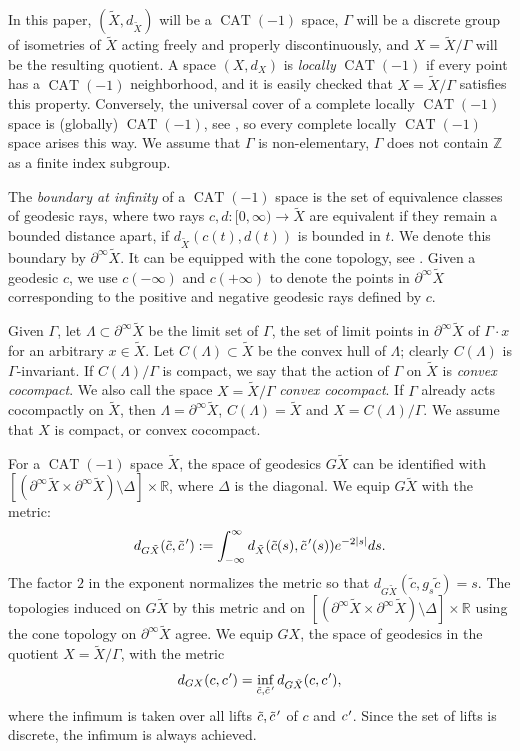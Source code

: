 \documentclass[JEP,XML,SOM,Unicode,NoFloatCountersInSection]{cedram}
\newcommand{\cpr}{c\mkern1mu'}
\newcommand{\tcpr}{\tilde c\mkern2mu'}
\theoremstyle{definition}
\numberwithin{equation}{section}
\DeclareMathOperator{\CAT}{CAT}
\begin{document}
In this paper, $(\tilde X, d_{\tilde X})$ will be a $\CAT(-1)$ space, $\Gamma$ will be a discrete group of isometries of $\tilde X$ acting freely and properly discontinuously, and $X=\tilde X/\Gamma$ will be the resulting quotient. A space $(X,d_X)$ is \emph{locally} $\CAT(-1)$ if every point has a $\CAT(-1)$ neighborhood, and it is easily checked that $X=\tilde X/\Gamma$ satisfies this property. Conversely, the universal cover of a complete locally $\CAT(-1)$ space is (globally) $\CAT(-1)$, see \eg \cite[Th.\,II.4.1]{bh}, so every complete locally $\CAT(-1)$ space arises this way. We assume that $\Gamma$ is non-elementary, \ie $\Gamma$ does not contain $\mathbb{Z}$ as a finite index subgroup.

The \emph{boundary at infinity} of a $\CAT(-1)$ space is the set of equivalence classes of geodesic rays, where two rays $c,d:[0,\infty) \to \tilde X$ are equivalent if they remain a bounded distance apart, \ie if $d_{\tilde X}(c(t), d(t))$ is bounded in $t$. We denote this boundary by $\partial^\infty \tilde X$. It can be equipped with the cone topology, see \eg \cite[Chap.\,II.8]{bh}. Given a geodesic $c$, we use $c(-\infty)$ and $c(+\infty)$ to denote the points in $\partial^\infty \tilde X$ corresponding to the positive and negative geodesic rays defined by $c$.

Given $\Gamma$, let $\Lambda \subset \partial^\infty \tilde X$ be the limit set of $\Gamma$, \ie the set of limit points in $\partial^\infty\tilde X$ of $\Gamma\cdot x$ for an arbitrary $x\in \tilde X$. Let $C(\Lambda) \subset \tilde X$ be the convex hull of $\Lambda$; clearly $C(\Lambda)$ is $\Gamma$\nobreakdash-invariant. If $C(\Lambda)/\Gamma$ is compact, we say that the action of $\Gamma$ on $\tilde X$ is \emph{convex cocompact}. We also call the space $X=\tilde X/\Gamma$ \emph{convex cocompact}. If $\Gamma$ already acts cocompactly on $\tilde X$, then $\Lambda=\partial^\infty \tilde X$, $C(\Lambda) = \tilde X$ and $X= C(\Lambda)/\Gamma$. We assume that $X$ is compact, or convex cocompact.

For a $\CAT(-1)$ space $\tilde X$, the space of geodesics $G\tilde X$ can be identified with \hbox{$[(\partial^\infty\tilde X \times \partial^\infty\tilde X)\setminus \Delta] \times \mathbb{R}$}, where $\Delta$ is the diagonal. We equip $G\tilde X$ with the metric:
\[ d_{G\tilde X}(\tilde c,\tcpr) := \int_{-\infty}^\infty d_{\tilde X}(\tilde c(s),\tcpr(s)) e^{-2|s|}ds.\]
The factor $2$ in the exponent normalizes the metric so that $d_{G\tilde X}(\tilde c, g_s \tilde c)=s$. The topologies induced on $G\tilde X$ by this metric and on $[(\partial^\infty\tilde X \times \partial^\infty\tilde X)\setminus \Delta] \times \mathbb{R}$ using the cone topology on $\partial^\infty \tilde X$ agree.
We equip $GX$, the space of geodesics in the quotient $X=\tilde X/\Gamma$, with the metric
\[ d_{GX}(c,\cpr) = \inf_{\tilde c,\tcpr} d_{G\tilde X}(c,\cpr),\]
where the infimum is taken over all lifts $\tilde c, \tcpr$ of $c$ and $\cpr$. Since the set of lifts is discrete, the infimum is always achieved.
\end{document}
